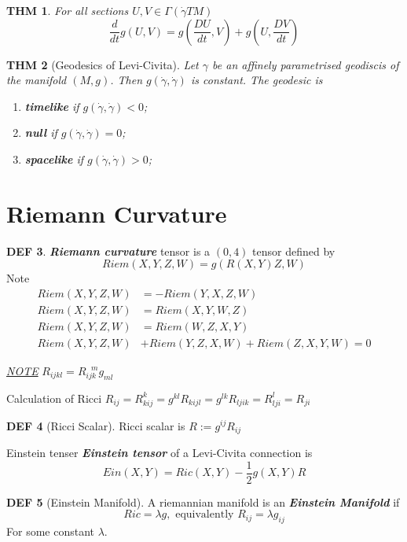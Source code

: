 \documentclass[twocolumn]{article}
\renewcommand{\emph}[1]{\textbf{\textit{#1}}}
\newcommand{\G}{\Gamma}
\newcommand{\g}{\gamma}
\newcommand{\dg}{\dot{\gamma}}
\newcommand{\N}{\textit{\underline{NOTE} }}
\renewcommand{\dg}{\dot{\gamma}}
\newtheorem{thm}{THM}
\theoremstyle{definition}
\newtheorem{defi}[thm]{DEF}
\begin{document}
\begin{thm}
	For all sections $U, V \in \G(\dg TM)$
	$$
	\frac{d}{dt} g(U, V) = g(\frac{DU}{dt} , V) + g(U, \frac{DV}{dt})
	$$
\end{thm}

\begin{thm}[Geodesics of Levi-Civita]
	Let $\g$ be an affinely parametrised geodiscis of the manifold $(M, g)$.
	Then $g(\dg, \dg)$ is constant.
	The geodesic is 
	\begin{enumerate}
		\item \emph{timelike} if $g(\dg, \dg) < 0$;
		\item \emph{null} if $g(\dg, \dg) = 0$;
		\item \emph{spacelike} if $g(\dg, \dg) > 0$;
	\end{enumerate}
\end{thm}

\section{Riemann Curvature}
\begin{defi}
	\emph{Riemann curvature} tensor is a $(0, 4)$ tensor defined by 
	$$
	Riem(X, Y, Z, W) = g(R(X, Y)Z, W)
	$$
	Note 
	\begin{align*}
		Riem(X, Y, Z, W) &= -Riem(Y, X, Z, W) \\
		Riem(X, Y, Z, W) &= Riem(X, Y, W, Z) \\
		Riem(X, Y, Z, W) &= Riem(W, Z, X, Y) \\
		Riem(X, Y, Z, W) &+ Riem(Y, Z, X, W) + Riem(Z, X, Y, W) = 0
	\end{align*}
\end{defi}

\N $R_{ijkl} = R_{ijk}^{\ \ \ m} g_{ml}$

\begin{eg}{Calculation of Ricci}{}
	$R_{ij} = R_{kij}^k = g^{kl}R_{kijl} = g^{lk}R_{ljik} = R_{lji}^l = R_{ji} $ 
\end{eg}

\begin{defi}[Ricci Scalar]
	Ricci scalar is $R := g^{ij}R_{ij}$
\end{defi}

\begin{fdefi}{Einstein tenser}{}
	\emph{Einstein tensor} of a Levi-Civita connection is 
	$$
	Ein(X, Y) = Ric(X, Y) - \frac{1}{2}g(X, Y)R
	$$
\end{fdefi}

\begin{defi}[Einstein Manifold]
	A riemannian manifold is an \emph{Einstein Manifold} if 
	$$
	Ric = \lambda g, \text{ equivalently } R_{ij} = \lambda g_{ij}
	$$
	For some constant $\lambda$.
\end{defi}
\end{document}
